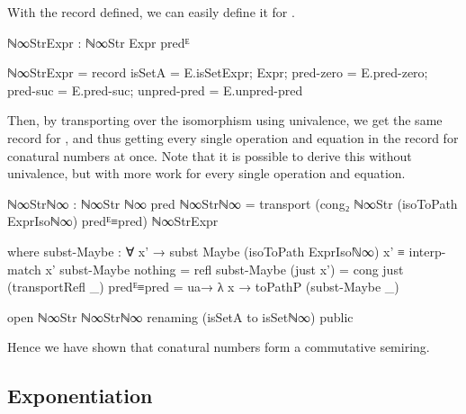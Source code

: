 With the record defined, we can easily define it for .
\begin{code}
ℕ∞StrExpr : ℕ∞Str Expr predᴱ
\end{code}
\begin{code}[hide]
ℕ∞StrExpr =
  record
    { isSetA = E.isSetExpr;
      Expr;
      pred-zero = E.pred-zero;
      pred-suc = E.pred-suc;
      unpred-pred = E.unpred-pred }
\end{code}
Then, by transporting over the isomorphism using univalence, we get the same
record for , and thus getting every single operation and equation
in the record for conatural numbers at once. Note that it is possible to derive
this without univalence, but with more work for every single operation and
equation.
\begin{code}
ℕ∞Strℕ∞ : ℕ∞Str ℕ∞ pred
ℕ∞Strℕ∞ =
  transport
    (cong₂ ℕ∞Str (isoToPath ExprIsoℕ∞) predᴱ≡pred)
    ℕ∞StrExpr
\end{code}
\begin{code}[hide]
  where
  subst-Maybe :
    ∀ x' → subst Maybe (isoToPath ExprIsoℕ∞) x' ≡ interp-match x'
  subst-Maybe nothing = refl
  subst-Maybe (just x') = cong just (transportRefl _)
  predᴱ≡pred = ua→ λ x → toPathP (subst-Maybe _)

open ℕ∞Str ℕ∞Strℕ∞ renaming (isSetA to isSetℕ∞) public
\end{code}
Hence we have shown that conatural numbers form a commutative semiring.

\subsection{Exponentiation}

